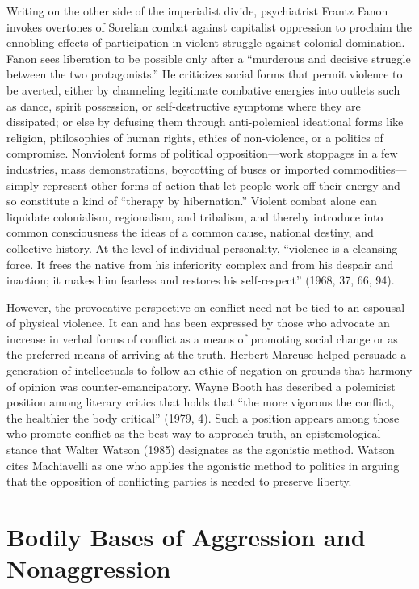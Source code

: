 Writing on the other side of the imperialist divide, psychiatrist Frantz Fanon invokes overtones of Sorelian combat against capitalist oppression to proclaim the ennobling effects of participation in violent struggle against colonial domination. Fanon sees liberation to be possible only after a ``murderous and decisive struggle between the two protagonists.'' He criticizes social forms that permit violence to be averted, either by channeling legitimate combative energies into outlets such as dance, spirit possession, or self-destructive symptoms where they are dissipated; or else by defusing them through anti-polemical ideational forms like religion, philosophies of human rights, ethics of non-violence, or a politics of compromise. Nonviolent forms of political opposition---work stoppages in a few industries, mass demonstrations, boycotting of buses or imported commodities---simply represent other forms of action that let people work off their energy and so constitute a kind of ``therapy by hibernation.'' Violent combat alone can liquidate colonialism, regionalism, and tribalism, and thereby introduce into common consciousness the ideas of a common cause, national destiny, and collective history. At the level of individual personality, ``violence is a cleansing force. It frees the native from his inferiority complex and from his despair and inaction; it makes him fearless and restores his self-respect'' (1968, 37, 66, 94).

However, the provocative perspective on conflict need not be tied to an espousal of physical violence. It can and has been expressed by those who advocate an increase in verbal forms of conflict as a means of promoting social change or as the preferred means of arriving at the truth. Herbert Marcuse helped persuade a generation of intellectuals to follow an ethic of negation on grounds that harmony of opinion was counter-emancipatory. Wayne Booth has described a polemicist position among literary critics that holds that ``the more vigorous the conflict, the healthier the body critical'' (1979, 4). Such a position appears among those who promote conflict as the best way to approach truth, an epistemological stance that Walter Watson (1985) designates as the agonistic method. Watson cites Machiavelli as one who applies the agonistic method to politics in arguing that the opposition of conflicting parties is needed to preserve liberty.

\section*{Bodily Bases of Aggression and Nonaggression}

